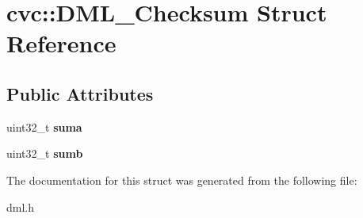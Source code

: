 \hypertarget{structcvc_1_1DML__Checksum}{\section{cvc\-:\-:D\-M\-L\-\_\-\-Checksum Struct Reference}
\label{structcvc_1_1DML__Checksum}
}
\subsection*{Public Attributes}
\begin{DoxyCompactItemize}
\item 
\hypertarget{structcvc_1_1DML__Checksum_ad69bc27c888d4ca7acd49b5a92002aea}{uint32\-\_\-t {\bfseries suma}}\label{structcvc_1_1DML__Checksum_ad69bc27c888d4ca7acd49b5a92002aea}

\item 
\hypertarget{structcvc_1_1DML__Checksum_aa363453eba340132469a55d621ad4781}{uint32\-\_\-t {\bfseries sumb}}\label{structcvc_1_1DML__Checksum_aa363453eba340132469a55d621ad4781}

\end{DoxyCompactItemize}


The documentation for this struct was generated from the following file\-:\begin{DoxyCompactItemize}
\item 
dml.\-h\end{DoxyCompactItemize}
